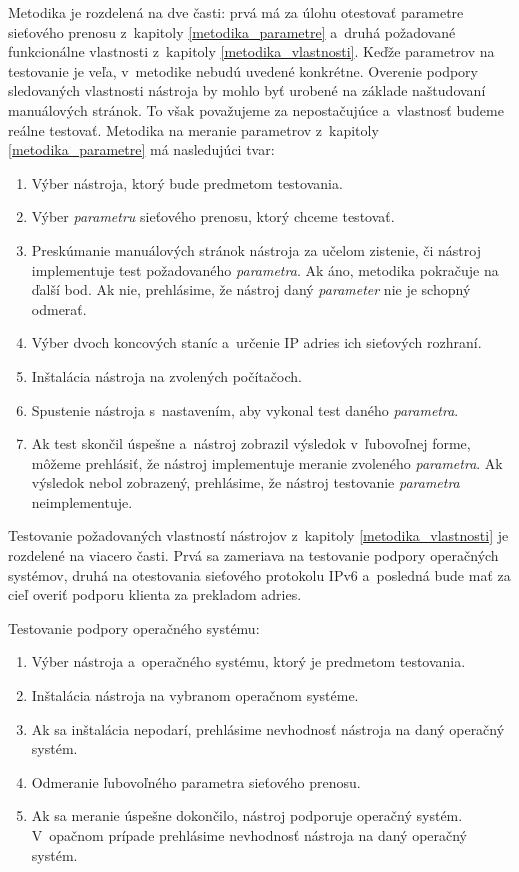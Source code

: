 Metodika je rozdelená na dve časti: prvá má za úlohu otestovať parametre 
sieťového prenosu z~kapitoly \ref{metodika_parametre} a~druhá požadované
funkcionálne vlastnosti z~kapitoly \ref{metodika_vlastnosti}. Keďže 
parametrov na testovanie je veľa, v~metodike nebudú uvedené
konkrétne. Overenie podpory sledovaných vlastnosti nástroja by mohlo byť 
urobené na základe naštudovaní manuálových stránok. To však považujeme 
za nepostačujúce a~vlastnosť budeme reálne testovať.
Metodika na meranie parametrov z~kapitoly \ref{metodika_parametre}
má nasledujúci tvar:

\begin{enumerate}
    \item Výber nástroja, ktorý bude predmetom testovania.
    \item Výber \emph{parametru} sieťového prenosu, ktorý chceme testovať.
    \item Preskúmanie manuálových stránok nástroja za učelom zistenie, či
        nástroj implementuje test požadovaného \emph{parametra}. Ak áno,
        metodika pokračuje na ďalší bod. Ak nie, prehlásime, že
        nástroj daný \emph{parameter} nie je schopný odmerať.
    \item Výber dvoch koncových staníc a~určenie IP adries ich sieťových
        rozhraní.
    \item Inštalácia nástroja na zvolených počítačoch.
    \item Spustenie nástroja s~nastavením, aby vykonal 
        test daného \emph{parametra}.
    \item Ak test skončil úspešne a~nástroj zobrazil výsledok v~ľubovoľnej
        forme, môžeme prehlásiť, že nástroj implementuje meranie zvoleného
        \emph{parametra}. Ak výsledok nebol zobrazený, prehlásime, že
            nástroj testovanie \emph{parametra} neimplementuje.
\end{enumerate}

Testovanie požadovaných vlastností nástrojov z~kapitoly
\ref{metodika_vlastnosti} je rozdelené na viacero časti. Prvá sa zameriava
na testovanie podpory operačných systémov, druhá na otestovania sieťového
protokolu IPv6 a~posledná bude mať za cieľ overiť podporu klienta za
prekladom adries.

\noindent Testovanie podpory operačného systému:
\begin{enumerate}
    \item Výber nástroja a~operačného systému, ktorý je predmetom testovania.
    \item Inštalácia nástroja na vybranom operačnom systéme.
    \item Ak sa inštalácia nepodarí, prehlásime nevhodnosť nástroja na daný 
        operačný systém.
    \item Odmeranie ľubovoľného parametra sieťového prenosu. 
    \item Ak sa meranie úspešne dokončilo, nástroj podporuje
        operačný systém.
        V~opačnom prípade
        prehlásime nevhodnosť nástroja na daný operačný systém. 
\end{enumerate}

